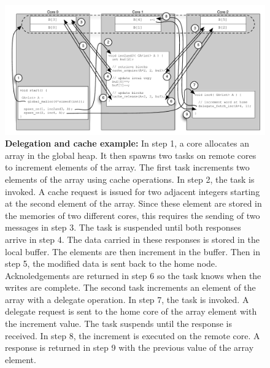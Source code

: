 \begin{figure}[htb]
\begin{center}
  \includegraphics[width=1.5\columnwidth]{figs/delegate-cache}
\begin{minipage}{1.9\columnwidth}
  \caption{\label{fig:delegate-cache} \textbf{Delegation and cache example:} In step 1, a core allocates an array in
the global heap. It then spawns two tasks on remote cores to increment
elements of the array.  The first task increments two elements of the array using cache
operations. In step 2, the task is invoked. A cache request is issued
for two adjacent integers starting at the second element of the
array. Since these element are stored in the memories of two different
cores, this requires the sending of two messages in step 3. The task
is suspended until both responses arrive in step 4. The data carried
in these responses is stored in the local buffer. The elements are
then increment in the buffer. Then in step 5, the modified data is
sent back to the home node. Acknoledgements are returned in step 6 so
the task knows when the writes are complete. The second task increments an element of the array with a delegate
operation. In step 7, the task is invoked. A delegate request is sent
to the home core of the array element with the increment value. The
task suspends until the response is received. In step 8, the increment
is executed on the remote core. A response is returned in step 9 with
the previous value of the array element.
}
\end{minipage}
\vspace{-3ex}
\end{center}
\end{figure}



